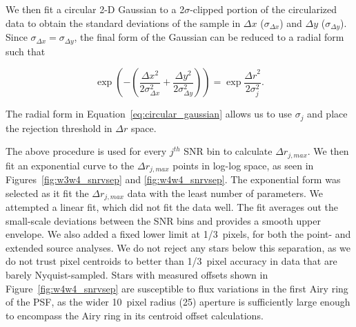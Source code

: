   

   \noindent We then fit a circular 2-D Gaussian to a 2$\sigma$-clipped portion of the circularized data to obtain the standard deviations of the sample in $\Delta x$ ($\sigma_{\Delta x}$) and $\Delta y$ ($\sigma_{\Delta y}$). Since $\sigma_{\Delta x} = \sigma_{\Delta y}$, the final form of the Gaussian can be reduced to a radial form such that
   
   \begin{equation}\label{eq:circular_gaussian}
   \exp{\left(-\left(\frac{\Delta x^2}{2\sigma_{\Delta x}^2} + \frac{\Delta y^2}{2\sigma_{\Delta y}^2}\right)\right)} = \exp{\frac{{\Delta r}^2}{2\sigma_j^2}}. 
   \end{equation}
  
  \noindent The radial form in Equation~\ref{eq:circular_gaussian} allows us to use $\sigma_j$ and place the rejection threshold in $\Delta r$ space. 
  
  
  The above procedure is used for every $j^{th}$ SNR bin to calculate $\Delta r_{j,max}$. We then fit an exponential curve to the $\Delta r_{j,max}$ points in log-log space, as seen in Figures~\ref{fig:w3w4_snrvsep} and \ref{fig:w4w4_snrvsep}. The exponential form was selected as it fit the $\Delta r_{j,max}$ data with the least number of parameters.  We attempted a linear fit, which did not fit the data well. The fit averages out the small-scale deviations between the SNR bins and provides a smooth upper envelope. We also added a fixed lower limit at 1/3~pixels, for both the point- and extended source analyses. We do not reject any stars below this separation, as we do not trust pixel centroids to better than 1/3~pixel accuracy in data that are barely Nyquist-sampled. Stars with measured offsets shown in Figure~\ref{fig:w4w4_snrvsep} are susceptible to flux variations in the first Airy ring of the PSF, as the wider 10~pixel radius (25\arcsec) aperture is sufficiently large enough to encompass the Airy ring in its centroid offset calculations. 
  
